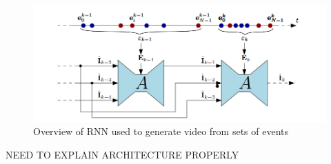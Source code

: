 \begin{figure}[htb]
      \centering
      \includegraphics[width=\textwidth]{background/images/spikes_to_video_rnn.png}
      \caption{Overview of RNN used to generate video from sets of events\cite{spikingToVideo}}
      \label{fig:spikes_to_video_rnn}
\end{figure}

\color{red} NEED TO EXPLAIN ARCHITECTURE PROPERLY\cite{spikingToVideo} \color{black}